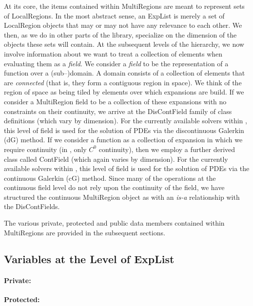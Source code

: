 At its core, the items contained within MultiRegions are meant to represent sets of LocalRegions.  In the most abstract sense, an 
ExpList is merely a set of LocalRegion objects that may or may not have any relevance to each other.   We then, as we do in 
other parts of the library, specialize on the dimension of the objects these sets will contain.  At the subsequent levels of the
hierarchy, we now involve information about we want to treat a collection of elements when evaluating them as a {\em field}.  
We consider a {\em field} to be the representation of a function over a (sub--)domain.  A domain consists of a collection of elements
that are {\em connected} (that is, they form a contiguous region in space).   We think of the region of space as being tiled by elements
over which expansions are build.  If we consider a MultiRegion field to be a collection of these expansions with no constraints on their
continuity, we arrive at the DisContField family of class definitions (which vary by dimension).  For the currently available solvers within
{\nek}, this level of field is used for the solution of PDEs via the discontinuous Galerkin (dG) method.
If we consider a function as a collection of expansion in which we require continuity (in {\nek}, only $C^0$ continuity), then we employ
a further derived class called ContField (which again varies by dimension).  For the currently available solvers
within {\nek}, this level of field is used for the solution of PDEs via the continuous Galerkin (cG) method.
Since many of the operations at the continuous field level do not rely upon the continuity of the field, we have structured the
continuous MultiRegion object as with an {\em is-a} relationship with the DisContFields.

The various private, protected and public data members contained within MultiRegions are provided in the subsequent sections.


\subsection{Variables at the Level of ExpList}

\paragraph{Private:}

\paragraph{Protected:}

